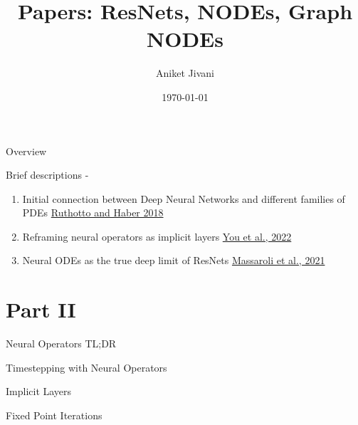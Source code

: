 \documentclass[usenames,dvipsnames]{beamer}
\title[Seminar]{Papers: ResNets, NODEs, Graph NODEs}
\author[AJ]{Aniket Jivani}
\date{\today}
\theoremstyle{definition}
\begin{document}
\begin{frame}
\titlepage %
\end{frame}


\begin{frame}{Overview}



Brief descriptions - 

\begin{enumerate}
    \item Initial connection between Deep Neural Networks and different families of PDEs \href{https://arxiv.org/abs/1804.04272}{Ruthotto and Haber 2018}
    
    \item Reframing neural operators as implicit layers \href{https://arxiv.org/abs/2203.08205}{You et al., 2022}
    
    \item Neural ODEs as the true deep limit of ResNets \href{https://arxiv.org/abs/2002.08071}{Massaroli et al., 2021}
\end{enumerate}

\end{frame}


\section{Part II}
\begin{frame}{Neural Operators TL;DR}



\end{frame}


\begin{frame}{Timestepping with Neural Operators}


\end{frame}

\begin{frame}{Implicit Layers}


\end{frame}


\begin{frame}{Fixed Point Iterations}



\end{frame}
\end{document}
